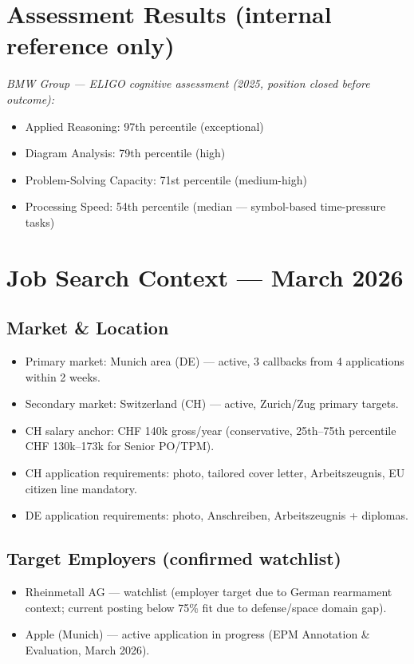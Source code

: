 \documentclass[10pt,a4paper]{article}
\begin{document}
\section{Assessment Results (internal reference only)}

\textit{BMW Group — ELIGO cognitive assessment (2025, position closed before outcome):}
\begin{itemize}
  \item Applied Reasoning: 97th percentile (exceptional)
  \item Diagram Analysis: 79th percentile (high)
  \item Problem-Solving Capacity: 71st percentile (medium-high)
  \item Processing Speed: 54th percentile (median — symbol-based time-pressure tasks)
\end{itemize}

\section{Job Search Context — March 2026}

\subsection*{Market \& Location}
\begin{itemize}
  \item Primary market: Munich area (DE) — active, 3 callbacks from 4 applications within 2 weeks.
  \item Secondary market: Switzerland (CH) — active, Zurich/Zug primary targets.
  \item CH salary anchor: CHF 140k gross/year (conservative, 25th–75th percentile CHF 130k–173k for Senior PO/TPM).
  \item CH application requirements: photo, tailored cover letter, Arbeitszeugnis, EU citizen line mandatory.
  \item DE application requirements: photo, Anschreiben, Arbeitszeugnis + diplomas.
\end{itemize}

\subsection*{Target Employers (confirmed watchlist)}
\begin{itemize}
  \item Rheinmetall AG — watchlist (employer target due to German rearmament context; current posting below 75\% fit due to defense/space domain gap).
  \item Apple (Munich) — active application in progress (EPM Annotation \& Evaluation, March 2026).
\end{itemize}
\end{document}

